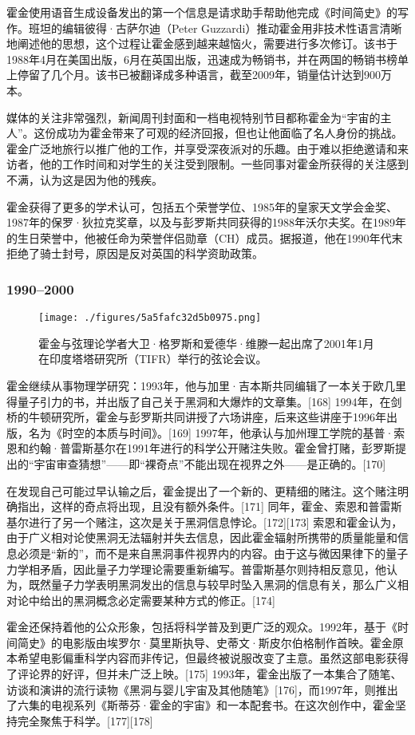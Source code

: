 霍金使用语音生成设备发出的第一个信息是请求助手帮助他完成《时间简史》的写作。班坦的编辑彼得·古萨尔迪（Peter Guzzardi）推动霍金用非技术性语言清晰地阐述他的思想，这个过程让霍金感到越来越恼火，需要进行多次修订。该书于1988年4月在美国出版，6月在英国出版，迅速成为畅销书，并在两国的畅销书榜单上停留了几个月。该书已被翻译成多种语言，截至2009年，销量估计达到900万本。

媒体的关注非常强烈，新闻周刊封面和一档电视特别节目都称霍金为“宇宙的主人”。这份成功为霍金带来了可观的经济回报，但也让他面临了名人身份的挑战。霍金广泛地旅行以推广他的工作，并享受深夜派对的乐趣。由于难以拒绝邀请和来访者，他的工作时间和对学生的关注受到限制。一些同事对霍金所获得的关注感到不满，认为这是因为他的残疾。

霍金获得了更多的学术认可，包括五个荣誉学位、1985年的皇家天文学会金奖、1987年的保罗·狄拉克奖章，以及与彭罗斯共同获得的1988年沃尔夫奖。在1989年的生日荣誉中，他被任命为荣誉伴侣勋章（CH）成员。据报道，他在1990年代末拒绝了骑士封号，原因是反对英国的科学资助政策。
\subsubsection{1990–2000}
\begin{figure}[ht]
\centering
\texttt{[image: ./figures/5a5fafc32d5b0975.png]}
\caption{霍金与弦理论学者大卫·格罗斯和爱德华·维滕一起出席了2001年1月在印度塔塔研究所（TIFR）举行的弦论会议。} \label{fig_HJ_3}
\end{figure}
霍金继续从事物理学研究：1993年，他与加里·吉本斯共同编辑了一本关于欧几里得量子引力的书，并出版了自己关于黑洞和大爆炸的文章集。[168] 1994年，在剑桥的牛顿研究所，霍金与彭罗斯共同讲授了六场讲座，后来这些讲座于1996年出版，名为《时空的本质与时间》。[169] 1997年，他承认与加州理工学院的基普·索恩和约翰·普雷斯基尔在1991年进行的科学公开赌注失败。霍金曾打赌，彭罗斯提出的“宇宙审查猜想”——即“裸奇点”不能出现在视界之外——是正确的。[170]

在发现自己可能过早认输之后，霍金提出了一个新的、更精细的赌注。这个赌注明确指出，这样的奇点将出现，且没有额外条件。[171] 同年，霍金、索恩和普雷斯基尔进行了另一个赌注，这次是关于黑洞信息悖论。[172][173] 索恩和霍金认为，由于广义相对论使黑洞无法辐射并失去信息，因此霍金辐射所携带的质量能量和信息必须是“新的”，而不是来自黑洞事件视界内的内容。由于这与微因果律下的量子力学相矛盾，因此量子力学理论需要重新编写。普雷斯基尔则持相反意见，他认为，既然量子力学表明黑洞发出的信息与较早时坠入黑洞的信息有关，那么广义相对论中给出的黑洞概念必定需要某种方式的修正。[174]

霍金还保持着他的公众形象，包括将科学普及到更广泛的观众。1992年，基于《时间简史》的电影版由埃罗尔·莫里斯执导、史蒂文·斯皮尔伯格制作首映。霍金原本希望电影偏重科学内容而非传记，但最终被说服改变了主意。虽然这部电影获得了评论界的好评，但并未广泛上映。[175] 1993年，霍金出版了一本集合了随笔、访谈和演讲的流行读物《黑洞与婴儿宇宙及其他随笔》[176]，而1997年，则推出了六集的电视系列《斯蒂芬·霍金的宇宙》和一本配套书。在这次创作中，霍金坚持完全聚焦于科学。[177][178]
